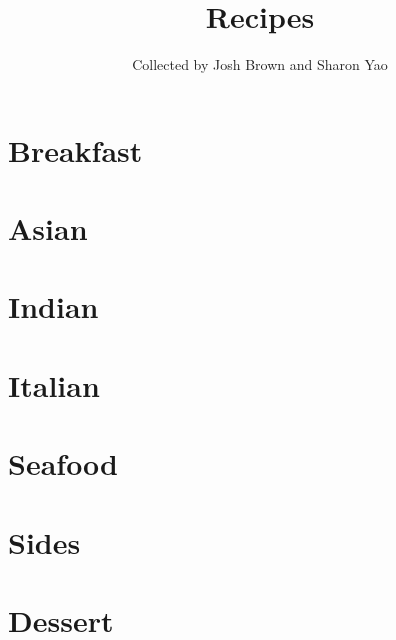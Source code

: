\documentclass[oneside,10pt]{book}
\title{\bf \Huge Recipes}
\author{Collected by Josh Brown and Sharon Yao}
\date{}
\begin{document}
\maketitle
\tableofcontents{}

\chapter{Breakfast}
    
    
    
    
    

\chapter{Asian}
    
    

\chapter{Indian}
    
    
    

\chapter{Italian}
    

\chapter{Seafood}
    
    
    
    
    
    

\chapter{Sides}
    
    

\chapter{Dessert}
    
    
    
    
\end{document}
